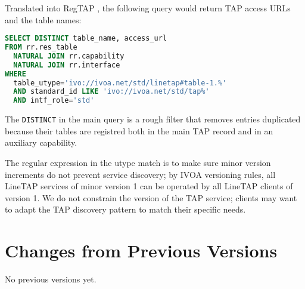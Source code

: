 \documentclass[11pt,a4paper]{ivoa}
\begin{document}
Translated into RegTAP \citep{2019ivoa.spec.1011D}, the following query
would return TAP access URLs and the table names:

\begin{lstlisting}[language=SQL]
SELECT DISTINCT table_name, access_url
FROM rr.res_table
  NATURAL JOIN rr.capability
  NATURAL JOIN rr.interface
WHERE
  table_utype='ivo://ivoa.net/std/linetap#table-1.%'
  AND standard_id LIKE 'ivo://ivoa.net/std/tap%'
  AND intf_role='std'
\end{lstlisting}

The \texttt{DISTINCT} in the main query is a rough filter that removes
entries duplicated because their tables are registred both in the main
TAP record and in an auxiliary capability.

The regular expression in the utype match is to make sure minor version
increments do not prevent service discovery; by IVOA versioning rules,
all LineTAP services of minor version 1 can be operated by all LineTAP
clients of version 1.  We do not constrain the version of the TAP
service; clients may want to adapt the TAP discovery pattern to match
their specific needs.



\appendix
\section{Changes from Previous Versions}

No previous versions yet.



\end{document}

